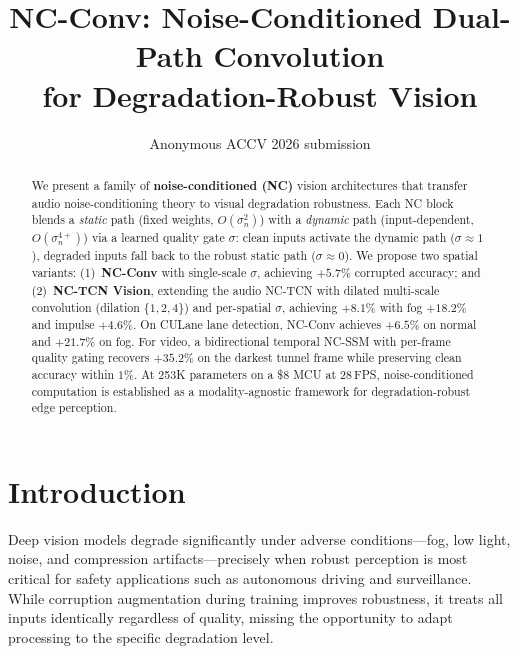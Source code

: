 \documentclass[runningheads]{llncs}
\begin{document}
\title{NC-Conv: Noise-Conditioned Dual-Path Convolution\\for Degradation-Robust Vision}


\author{Anonymous ACCV 2026 submission}

\maketitle

\begin{abstract}
We present a family of \textbf{noise-conditioned (NC)} vision architectures that transfer audio noise-conditioning theory to visual degradation robustness.
Each NC block blends a \textcolor{fixcolor}{\emph{static}} path (fixed weights, $O(\sigma_n^2)$) with a \textcolor{dyncolor}{\emph{dynamic}} path (input-dependent, $O(\sigma_n^{4+})$) via a learned quality gate $\sigma$: clean inputs activate the dynamic path ($\sigma{\approx}1$), degraded inputs fall back to the robust static path ($\sigma{\approx}0$).
We propose two spatial variants: (1)~\textbf{NC-Conv} with single-scale $\sigma$, achieving $+5.7\%$ corrupted accuracy; and (2)~\textbf{NC-TCN Vision}, extending the audio NC-TCN with dilated multi-scale convolution (dilation $\{1,2,4\}$) and per-spatial $\sigma$, achieving $\mathbf{+8.1\%}$ with fog $+18.2\%$ and impulse $+4.6\%$.
On CULane lane detection, NC-Conv achieves $+6.5\%$ on normal and $\mathbf{+21.7\%}$ on fog.
For video, a \textcolor{tempcolor}{bidirectional temporal NC-SSM} with per-frame quality gating recovers $\mathbf{+35.2\%}$ on the darkest tunnel frame while preserving clean accuracy within $1\%$.
At 253K parameters on a \$8 MCU at 28\,FPS, noise-conditioned computation is established as a modality-agnostic framework for degradation-robust edge perception.

\end{abstract}

\section{Introduction}
\label{sec:intro}

Deep vision models degrade significantly under adverse conditions---fog, low light, noise, and compression artifacts---precisely when robust perception is most critical for safety applications such as autonomous driving and surveillance.
While corruption augmentation during training improves robustness, it treats all inputs identically regardless of quality, missing the opportunity to adapt processing to the specific degradation level.
\end{document}
